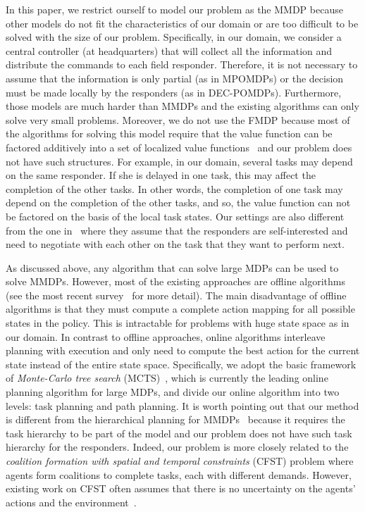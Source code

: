 In this paper, we restrict ourself to model our problem as the MMDP because other models do not fit the characteristics of our domain or are too difficult to be solved with the size of our problem. Specifically, in our domain, we consider a central controller (at headquarters) that will collect all the information and distribute the commands to each field responder. Therefore, it is not necessary to assume that the information is only partial (as in MPOMDPs) or the decision must be made locally by the responders (as in DEC-POMDPs). Furthermore, those models are much harder than MMDPs and the existing algorithms can only solve very small problems. Moreover, we do not use the FMDP because most of the algorithms for solving this model require that the value function can be factored additively into a set of localized value functions~\cite{koller2000policy,guestrin2001multiagent,guestrin2003efficient} and our problem does not have such structures. For example, in our domain, several tasks may depend on the same responder. If she is delayed in one task, this may affect the completion of the other tasks. In other words, the completion of one task may depend on the completion of the other tasks, and  so, the value function can not be factored on the basis of the local task states. Our settings are also different from the one in~\cite{Chapman2009} where they assume that the responders are self-interested and need to negotiate with each other on the task that they want to perform next.

As discussed above, any algorithm that can solve large MDPs can be used to solve MMDPs. However, most of the existing approaches are offline algorithms (see the most recent survey~\cite{kolobov2012planning} for more detail). The main disadvantage of offline algorithms is that they must compute a
complete action mapping for all possible states in the policy. This is intractable for problems with huge state space as in our domain. In contrast to offline approaches, online algorithms interleave planning with execution and only need to compute the best action for the current state instead of the entire state space. Specifically, we adopt the basic framework of {\em Monte-Carlo tree search} (MCTS)~\cite{kocsis2006bandit}, which is currently the
leading online planning algorithm for large MDPs, and divide our online algorithm into two levels: task planning and path planning. It is worth pointing out that our method is different from the hierarchical planning for MMDPs~\cite{musliner2006coordinated} because it requires the task hierarchy to be part of the model and our problem does not have such task hierarchy for the responders. Indeed, our problem is more closely related to the {\em coalition formation with spatial and temporal constraints} (CFST) problem where agents form coalitions to complete tasks, each with different demands. However, existing work on CFST often assumes that there is no uncertainty on the agents' actions and the environment~\cite{ramchurn:etal:2010}.

%
%
